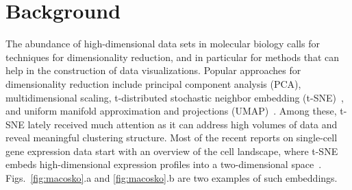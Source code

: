 \documentclass[twocolumn]{bmcart}
\begin{document}


\section*{Background}

%
%



The abundance of high-dimensional data sets in molecular biology calls for
techniques for dimensionality reduction, and in particular for methods that can
help in the construction of data visualizations. Popular approaches for
dimensionality reduction include principal component analysis (PCA), multidimensional
scaling, t-distributed stochastic
neighbor embedding (t-SNE)~\cite{maaten2008visualizing}, and uniform manifold approximation and
projections (UMAP)~\cite{2018arXivUMAP}. Among these, t-SNE lately received much
attention as it can address high volumes of data and reveal meaningful
clustering structure. Most of the recent reports on single-cell gene expression
data start with an overview of the cell landscape, where t-SNE embeds
high-dimensional expression profiles into a two-dimensional
space~\cite{macosko2015highly,cao2019single,tasic2018shared}.
Figs.~\ref{fig:macosko}.a and \ref{fig:macosko}.b are two examples of such
embeddings.
\end{document}
